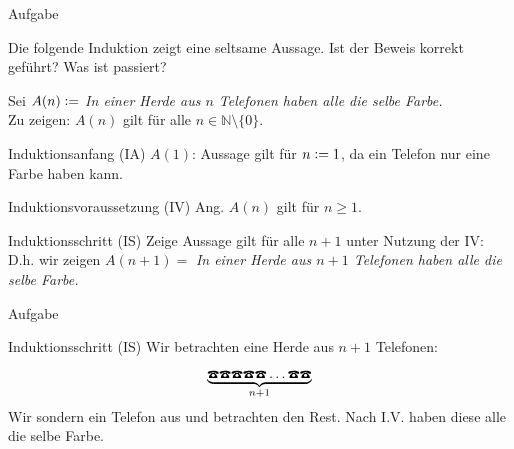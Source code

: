 %
%
%
%

{
	\begin{frame}[fragile]{Aufgabe}
		\begin{alertblock}{Die folgende Induktion zeigt eine seltsame Aussage.}
			Ist der Beweis korrekt geführt? Was ist passiert?
		\end{alertblock}
		Sei $A(n)\vcentcolon=$ \emph{In einer Herde aus $n$ Telefonen haben alle die selbe Farbe.}\\
		Zu zeigen: $A(n)$ gilt für alle $n \in \mathbb{N} \setminus \{0\} $.
		\begin{alertblock}{Induktionsanfang (IA)}
			$A(1)$: Aussage gilt für $n\vcentcolon= 1$, da ein Telefon nur eine Farbe haben kann.
		\end{alertblock}
		\begin{alertblock}{Induktionsvoraussetzung (IV)}
			Ang. $A(n)$ gilt für $n\geq1$.
		\end{alertblock}
		\begin{alertblock}{Induktionsschritt (IS)}
			Zeige Aussage gilt für alle $n+1$ unter Nutzung der IV:\\
			D.h. wir zeigen $A(n+1)=$ \emph{In einer Herde aus $n+1$ Telefonen haben alle die selbe Farbe.}
		\end{alertblock}
	\end{frame}
	\begin{frame}[fragile]{Aufgabe}
		\footnotesize{
			\begin{alertblock}{Induktionsschritt (IS)}
				Wir betrachten eine Herde aus $n+1$ Telefonen:
				\[\underbrace{\text{\Telefon}\text{\Telefon}\text{\Telefon}\text{\Telefon}\text{\Telefon}\dots\text{\Telefon}\text{\Telefon}}_{n+1}\]
				Wir sondern ein Telefon aus und betrachten den Rest. Nach I.V. haben diese alle die selbe Farbe.

\end{alertblock}}
\end{frame}}
